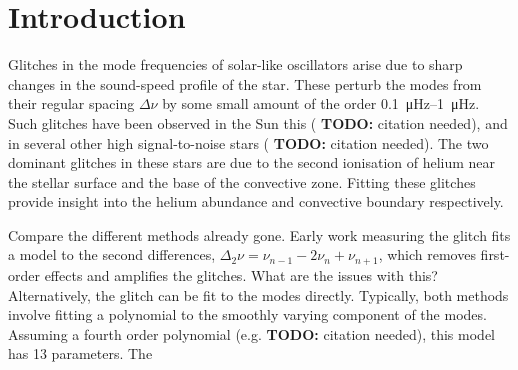 \documentclass[linenumbers,modern,astrosymb,times]{aastex631dm}
\newcommand{\todo}[1]{{\color{todo} \textbf{TODO:} #1}}
\newcommand{\needcite}{\todo{citation needed}}
\begin{document}

\section{Introduction}\label{sec:intro}

Glitches in the mode frequencies of solar-like oscillators arise due to sharp
changes in the sound-speed profile of the star. These perturb the modes from
their regular spacing \(\Delta\nu\) by some small amount of the order
\SIrange{0.1}{1}{\micro\Hz}. Such glitches have been observed in the Sun this (\needcite),
and in several other high signal-to-noise stars (\needcite). The two dominant
glitches in these stars are due to the second ionisation of helium near the
stellar surface and the base of the convective zone. Fitting these
glitches provide insight into the helium abundance and convective boundary
respectively.

Compare the different methods already gone. Early work measuring the glitch
fits a model to the second differences,
\(\Delta_2\nu = \nu_{n-1} - 2\nu_n + \nu_{n+1}\),
which removes first-order effects and amplifies the glitches. What are the
issues with this? Alternatively,
the glitch can be fit to the modes directly. Typically, both methods involve
fitting a polynomial to the smoothly varying component of the modes. Assuming
a fourth order polynomial (e.g. \needcite), this model has 13 parameters. The
\end{document}
